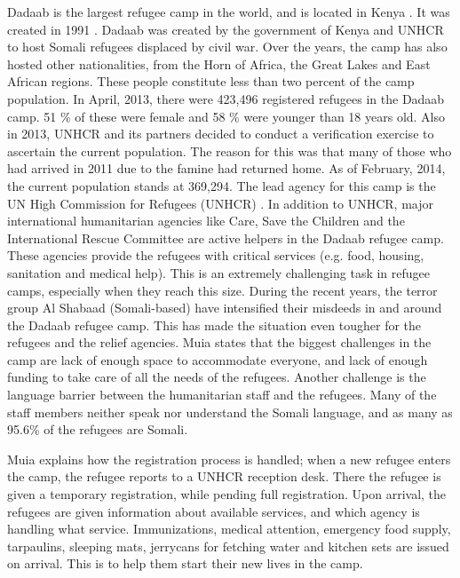 Dadaab is the largest refugee camp in the world, and is located in Kenya \cite{dadaab}. It was created in 1991 \cite{dadaabcare}. Dadaab was created by the government of Kenya and UNHCR to host Somali refugees displaced by civil war. Over the years, the camp has also hosted other nationalities, from the Horn of Africa, the Great Lakes and East African regions. These people constitute less than two percent of the camp population. In April, 2013, there were 423,496 registered refugees in the Dadaab camp. 51 \% of these were female and 58 \% were younger than 18 years old. Also in 2013, UNHCR and its partners decided to conduct a verification exercise to ascertain the current population. The reason for this was that many of those who had arrived in 2011 due to the famine had returned home. As of February, 2014, the current population stands at 369,294. The lead agency for this camp is the UN High Commission for Refugees (UNHCR) \cite{dadaab}. In addition to UNHCR, major international humanitarian agencies like Care, Save the Children and the International Rescue Committee are active helpers in the Dadaab refugee camp. These agencies provide the refugees with critical services (e.g. food, housing, sanitation and medical help). This is an extremely challenging task in refugee camps, especially when they reach this size. During the recent years, the terror group Al Shabaad (Somali-based) have intensified their misdeeds in and around the Dadaab refugee camp. This has made the situation even tougher for the refugees and the relief agencies. 
Muia states that the biggest challenges in the camp are lack of enough space to accommodate everyone, and lack of enough funding to take care of all the needs of the refugees. Another challenge is the language barrier between the humanitarian staff and the refugees. Many of the staff members neither speak nor understand the Somali language, and as many as 95.6\% of the refugees are Somali. 

Muia explains how the registration process is handled; when a new refugee enters the camp, the refugee reports to a UNHCR reception desk. There the refugee is given a temporary registration, while pending full registration. Upon arrival, the refugees are given information about available services, and which agency is handling what service. Immunizations, medical attention, emergency food supply, tarpaulins, sleeping mats, jerrycans for fetching water and kitchen sets are issued on arrival. This is to help them start their new lives in the camp. 

